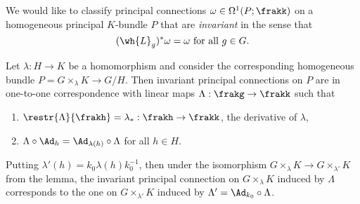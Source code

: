 We would like to classify principal connections $\omega\in\Omega^1(P;\frakk)$ on a homogeneous principal $K$-bundle $P$ that are \emph{invariant} in the sense that 
\[(\wh{L}_g)^\ast\omega=\omega \text{ for all }g\in G.\] 

\begin{thm}\label{thm 1.4.5 Cap}
    Let $\lambda:H\to K$ be a homomorphism and consider the corresponding homogeneous bundle $P=G\times_\lambda K\to G\slash H$. Then invariant principal connections on $P$ are in one-to-one correspondence with linear maps $\Lambda:\frakg\to \frakk$ such that 
    \begin{enumerate}[label=(\roman*)]
        \item $\restr{\Lambda}{\frakh}=\lambda_\ast:\frakh\to \frakk$, the derivative of $\lambda$,
        \item $\Lambda\circ \Ad_h=\Ad_{\lambda(h)}\circ\Lambda$ for all $h\in H$.
    \end{enumerate}
    Putting $\lambda'(h)=k_0\lambda(h)k_0^{-1}$, then under the isomorphism $G\times_\lambda K\to G\times_{\lambda '}K$ from the lemma, the invariant principal connection on $G\times_\lambda K$ induced by $\Lambda$ corresponds to the one on $G\times_{\lambda'}K$ induced by $\Lambda'=\Ad_{k_0}\circ\Lambda$.
\end{thm}
